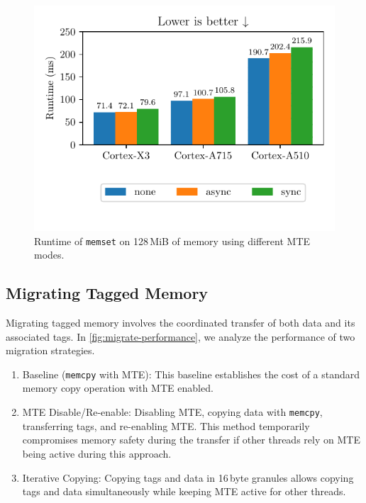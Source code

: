\begin{figure}[h]
    \centering
    \includegraphics{plots/sync-async}
    \caption{Runtime of \texttt{memset} on 128\,MiB of memory using different \ac{MTE} modes.}
    \label{fig:sync-async-performance}
\end{figure}

\subsection{Migrating Tagged Memory}
\label{subsec:migrating-tagged-memory}

Migrating tagged memory involves the coordinated transfer of both data and its associated tags.
In \cref{fig:migrate-performance}, we analyze the performance of two migration strategies.

\begin{enumerate}
    \item Baseline (\texttt{memcpy} with \ac{MTE}): This baseline establishes the cost of a standard memory copy operation with \ac{MTE} enabled.
    \item \ac{MTE} Disable/Re-enable: Disabling \ac{MTE}, copying data with \texttt{memcpy}, transferring tags, and re-enabling \ac{MTE}.
    This method temporarily compromises memory safety during the transfer if other threads rely on \ac{MTE} being active during this approach.
    \item Iterative Copying: Copying tags and data in 16\,byte granules allows copying tags and data simultaneously while keeping \ac{MTE} active for other threads.
\end{enumerate}

